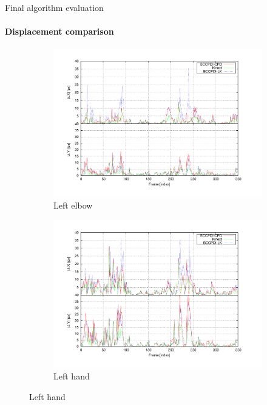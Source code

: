 \begin{frame}[plain]{Final algorithm evaluation}
  \framesubtitle{Displacement comparison}
  \begin{figure}
        \centering

        \begin{subfigure}[b]{0.4\columnwidth}
                \centering
                \includegraphics[width=\textwidth, trim=50 40 80 40,clip]{fig27.pdf}
                \caption*{Left elbow}
        \end{subfigure}%
        \begin{subfigure}[b]{0.4\columnwidth}
                \centering
		  \includegraphics[width=\textwidth, trim=50 40 80 40,clip]{fig28.pdf}
                \caption*{Left hand}
        \end{subfigure}%


\end{figure}
\end{frame}
